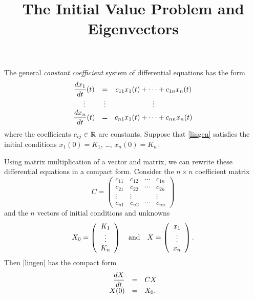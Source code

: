 \documentclass{ximera}
\title{The Initial Value Problem and Eigenvectors}
\begin{document}
\begin{abstract}
\end{abstract}
\maketitle


\label{S:IVP&E} 

The general {\em constant coefficient\/}
system of differential equations has the form
\renewcommand{\arraystretch}{1.8}
\begin{equation}\label{lingen}
\begin{array}{ccc}
\displaystyle \frac{dx_1}{dt}(t) & = & c_{11}x_1(t) + \cdots + c_{1n}x_n(t) \\
\vdots  & \vdots & \vdots \\
\displaystyle \frac{dx_n}{dt}(t) & = & c_{n1}x_1(t) + \cdots + c_{nn}x_n(t)
\end{array}
\end{equation}
\renewcommand{\arraystretch}{1.0}%
where the coefficients $c_{ij}\in \mbox{$\Bbb{R}$}$ are constants.  Suppose that 
\eqref{lingen} satisfies the initial conditions $x_1(0) = K_1$, \ldots,  
$x_n(0) = K_n$.

Using matrix multiplication of a vector and matrix, we can rewrite these 
differential equations in a compact form.   Consider the $n\times n$ 
coefficient matrix
\[
C = \left(
\begin{array}{rrrr}
 c_{11} & c_{12} & \cdots & c_{1n} \\
 c_{21} & c_{22} & \cdots & c_{2n}  \\
 \vdots & \vdots &        & \vdots  \\
 c_{n1} & c_{n2} & \cdots & c_{nn}
\end{array}
\right)
\]
and the $n$ vectors of initial conditions and unknowns
\[
X_0=\left(
\begin{array}{ccc}
K_1 \\ \vdots  \\ K_n
\end{array}
\right) \quad\mbox{and}\quad
X=\left(
\begin{array}{ccc}
x_1 \\ \vdots  \\ x_n
\end{array}
\right).
\]
Then \eqref{lingen} has the compact form
\begin{equation}  \label{E:geneqn}
\begin{array}{rcl}
\displaystyle\frac{dX}{dt} & = & CX\\
X(0) & = & X_0.  
\end{array}
\end{equation}
\end{document}
